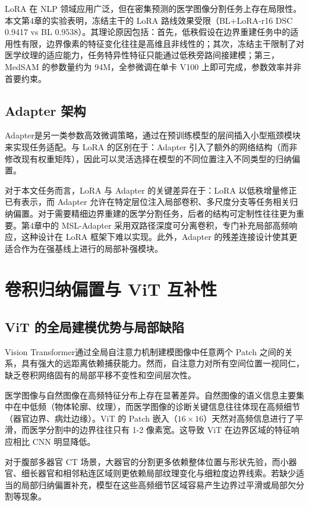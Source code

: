 LoRA 在 NLP 领域应用广泛，但在密集预测的医学图像分割任务上存在局限性。本文第4章的实验表明，冻结主干的 LoRA 路线效果受限（BL+LoRA-r16 DSC 0.9417 vs BL 0.9538）。其理论原因包括：首先，低秩假设在边界重建任务中的适用性有限，边界像素的特征变化往往是高维且非线性的；其次，冻结主干限制了对医学纹理的适应能力，任务特异性特征只能通过低秩旁路间接建模；第三，MedSAM 的参数量约为 94M，全参微调在单卡 V100 上即可完成，参数效率并非首要约束。

\subsection{Adapter 架构}

Adapter\cite{houlsby2019adapter}是另一类参数高效微调策略，通过在预训练模型的层间插入小型瓶颈模块来实现任务适配。与 LoRA 的区别在于：Adapter 引入了额外的网络结构（而非修改现有权重矩阵），因此可以灵活选择在模型的不同位置注入不同类型的归纳偏置。

对于本文任务而言，LoRA 与 Adapter 的关键差异在于：LoRA 以低秩增量修正已有表示，而 Adapter 允许在特定层位注入局部卷积、多尺度分支等任务相关归纳偏置。对于需要精细边界重建的医学分割任务，后者的结构可定制性往往更为重要。第4章中的 MSL-Adapter 采用双路径深度可分离卷积，专门补充局部高频响应，这种设计在 LoRA 框架下难以实现。此外，Adapter 的残差连接设计使其更适合作为在强基线上进行的局部补强模块。

\section{卷积归纳偏置与 ViT 互补性}

\subsection{ViT 的全局建模优势与局部缺陷}

Vision Transformer\cite{dosovitskiy2021vit}通过全局自注意力机制建模图像中任意两个 Patch 之间的关系，具有强大的远距离依赖捕获能力。然而，自注意力对所有空间位置一视同仁，缺乏卷积网络固有的局部平移不变性和空间层次性\cite{dai2021coatnet}。

医学图像与自然图像在高频特征分布上存在显著差异。自然图像的语义信息主要集中在中低频（物体轮廓、纹理），而医学图像的诊断关键信息往往体现在高频细节（器官边界、病灶边缘）。ViT 的 Patch 嵌入（$16\times16$）天然对高频信息进行了平滑，而医学分割中的边界往往只有 1-2 像素宽。这导致 ViT 在边界区域的特征响应相比 CNN 明显降低。

对于腹部多器官 CT 场景，大器官的分割更多依赖整体位置与形状先验，而小器官、细长器官和相邻粘连区域则更依赖局部纹理变化与细粒度边界线索。若缺少适当的局部归纳偏置补充，模型在这些高频细节区域容易产生边界过平滑或局部欠分割等现象。


